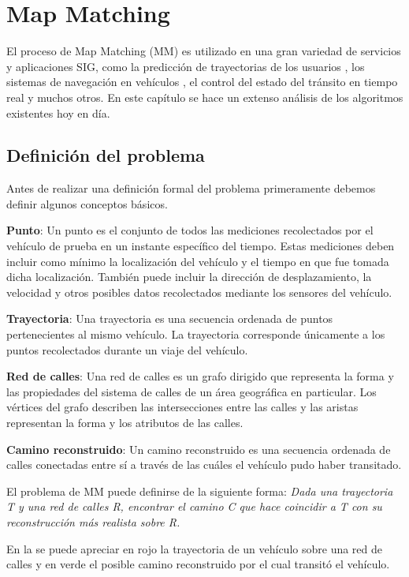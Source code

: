 \chapter{Map Matching}

El proceso de Map Matching (MM) es utilizado en una gran variedad de servicios y aplicaciones SIG, como la predicción de trayectorias de los usuarios \cite{eisner2011algorithms}, los sistemas de navegación en vehículos \cite{kim2001adaptive}, el control del estado del tránsito en tiempo real \cite{thiagarajan2010cooperative, thiagarajan2009vtrack} y muchos otros. En este capítulo se hace un extenso análisis de los algoritmos existentes hoy en día.

\section{Definición del problema}

Antes de realizar una definición formal del problema primeramente debemos definir algunos conceptos básicos.

\textbf{Punto}: Un punto es el conjunto de todos las mediciones recolectados por el vehículo de prueba en un instante específico del tiempo. Estas mediciones deben incluir como mínimo la localización del vehículo y el tiempo en que fue tomada dicha localización. También puede incluir la dirección de desplazamiento, la velocidad y otros posibles datos recolectados mediante los sensores del vehículo.

\textbf{Trayectoria}: Una trayectoria es una secuencia ordenada de puntos pertenecientes al mismo vehículo. La trayectoria corresponde únicamente a los puntos recolectados durante un viaje del vehículo.

\textbf{Red de calles}: Una red de calles es un grafo dirigido que representa la forma y las propiedades del sistema de calles de un área geográfica en particular. Los vértices del grafo describen las intersecciones entre las calles y las aristas representan la forma y los atributos de las calles.

\textbf{Camino reconstruido}: Un camino reconstruido es una secuencia ordenada de calles conectadas entre sí a través de las cuáles el vehículo pudo haber transitado.

El problema de MM puede definirse de la siguiente forma: \emph{Dada una trayectoria T y una red de calles R, encontrar el camino C que hace coincidir a T con su reconstrucción más realista sobre R.}

En la  se puede apreciar en rojo la trayectoria de un vehículo sobre una red de calles y en verde el posible camino reconstruido por el cual transitó el vehículo.

